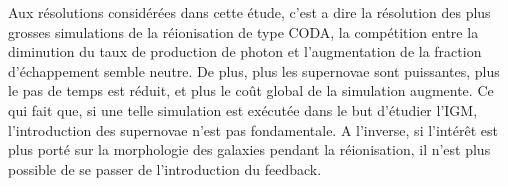 Aux résolutions considérées dans cette étude, c'est a dire la résolution des plus grosses simulations de la réionisation de type CODA,  %
la compétition entre la diminution du taux de production de photon et l'augmentation de la fraction d'échappement semble neutre.
De plus, plus les supernovae sont puissantes, plus le pas de temps est réduit, et plus le coût global de la simulation augmente.
Ce qui fait que, si une telle simulation est exécutée dans le but d'étudier l'\ac{IGM}, l'introduction des supernovae n'est pas fondamentale.
A l'inverse, si l’intérêt est plus porté sur la morphologie des galaxies pendant la réionisation, il n'est plus possible de se passer de l'introduction du feedback.









